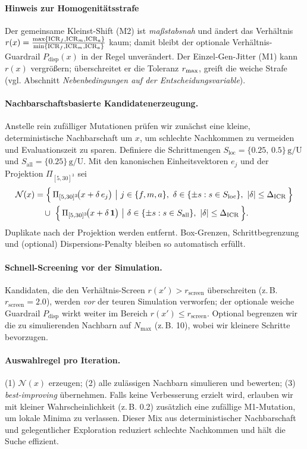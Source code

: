 \paragraph{Hinweis zur Homogenitätsstrafe}
Der gemeinsame Kleinst-Shift (M2) ist \emph{maßstabsnah} und ändert das Verhältnis \(r(x)=\tfrac{\max\{\mathrm{ICR}_f,\mathrm{ICR}_m,\mathrm{ICR}_a\}}{\min\{\mathrm{ICR}_f,\mathrm{ICR}_m,\mathrm{ICR}_a\}}\) kaum; damit bleibt der optionale Verhältnis-Guardrail \(P_{\mathrm{disp}}(x)\) in der Regel unverändert. Der Einzel-Gen-Jitter (M1) kann \(r(x)\) vergrößern; überschreitet er die Toleranz \(r_{\max}\), greift die weiche Strafe (vgl. Abschnitt \emph{Nebenbedingungen auf der Entscheidungsvariable}).

\paragraph{Nachbarschaftsbasierte Kandidatenerzeugung.}
Anstelle rein zufälliger Mutationen prüfen wir zunächst eine kleine, deterministische Nachbarschaft um \(x\), um schlechte Nachkommen zu vermeiden und Evaluationszeit zu sparen. Definiere die Schrittmengen \(S_{\text{loc}}=\{0.25,\,0.5\}\,\mathrm{g/U}\) und \(S_{\text{all}}=\{0.25\}\,\mathrm{g/U}\).
Mit den kanonischen Einheitsvektoren \(e_j\) und der Projektion \(\Pi_{[5,30]^3}\) sei
\[
\begin{aligned}
\mathcal{N}(x)
&= \Big\{\, \Pi_{[5,30]^3}\!\big(x+\delta\,e_j\big)\ \big|\ j\in\{f,m,a\},\ \delta\in\{\pm s : s\in S_{\text{loc}}\},\ |\delta|\le \DICR \,\Big\}\\
&\quad\cup\ \Big\{\, \Pi_{[5,30]^3}\!\big(x+\delta\,\mathbf{1}\big)\ \big|\ \delta\in\{\pm s : s\in S_{\text{all}}\},\ |\delta|\le \DICR \,\Big\}.
\end{aligned}
\]
Duplikate nach der Projektion werden entfernt. Box-Grenzen, Schrittbegrenzung und (optional) Dispersions-Penalty bleiben so automatisch erfüllt.

\paragraph{Schnell-Screening vor der Simulation.}
Kandidaten, die den Verhältnis-Screen \(r(x')>r_{\text{screen}}\) überschreiten (z.\,B. \(r_{\text{screen}}=2.0\)), werden \emph{vor} der teuren Simulation verworfen; der optionale weiche Guardrail \(P_{\mathrm{disp}}\) wirkt weiter im Bereich \(r(x')\le r_{\text{screen}}\).
Optional begrenzen wir die zu simulierenden Nachbarn auf \(N_{\max}\) (z.\,B. 10), wobei wir kleinere Schritte bevorzugen.

\paragraph{Auswahlregel pro Iteration.}
(1) \(\mathcal{N}(x)\) erzeugen; (2) alle zulässigen Nachbarn simulieren und bewerten; (3) \emph{best-improving} übernehmen.
Falls keine Verbesserung erzielt wird, erlauben wir mit kleiner Wahrscheinlichkeit (z.\,B. 0.2) zusätzlich eine zufällige M1-Mutation, um lokale Minima zu verlassen.
Dieser Mix aus deterministischer Nachbarschaft und gelegentlicher Exploration reduziert schlechte Nachkommen und hält die Suche effizient.